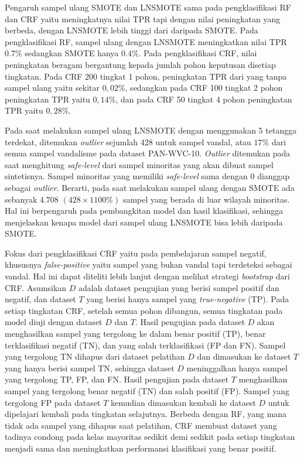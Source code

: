 Pengaruh sampel ulang SMOTE dan LNSMOTE sama pada pengklasifikasi RF dan
CRF yaitu meningkatnya nilai TPR tapi dengan nilai peningkatan yang berbeda,
dengan LNSMOTE lebih tinggi dari daripada SMOTE.
Pada pengklasifikasi RF, sampel ulang dengan LNSMOTE meningkatkan nilai TPR
$0.7\%$ sedangkan SMOTE hanya $0.4\%$.
Pada pengklasifikasi CRF, nilai peningkatan beragam bergantung kepada jumlah
pohon keputusan disetiap tingkatan.
Pada CRF 200 tingkat 1 pohon, peningkatan TPR dari yang tanpa sampel ulang
yaitu sekitar $0,02\%$, sedangkan pada CRF 100 tingkat 2 pohon peningkatan TPR
yaitu $0,14\%$, dan pada CRF 50 tingkat 4 pohon peningkatan TPR yaitu $0,28\%$.


Pada saat melakukan sampel ulang LNSMOTE dengan menggunakan 5 tetangga
terdekat, ditemukan \textit{outlier} sejumlah 428 untuk sampel vandal, atau
$17\%$ dari semua sampel vandalisme pada dataset PAN-WVC-10.
\textit{Outlier} ditemukan pada saat menghitung \textit{safe-level} dari sampel
minoritas yang akan dibuat sampel sintetisnya.
Sampel minoritas yang memiliki \textit{safe-level} sama dengan  $ 0 $
dianggap sebagai \textit{outlier}.
Berarti, pada saat melakukan sampel ulang dengan SMOTE ada sebanyak
$ 4.708 $ $ (428 \times 1100\%) $
sampel yang berada di luar wilayah minoritas.
Hal ini berpengaruh pada pembangkitan model dan hasil klasifikasi, sehingga
menjelaskan kenapa model dari sampel ulang LNSMOTE bisa lebih daripada SMOTE.


Fokus dari pengklasifikasi CRF yaitu pada pembelajaran sampel negatif,
khususnya \textit{false-positive} yaitu sampel yang bukan vandal tapi
terdeteksi sebagai vandal.
Hal ini dapat diteliti lebih lanjut dengan melihat strategi \textit{bootstrap}
dari CRF.
Asumsikan $D$ adalah dataset pengujian yang berisi sampel positif dan negatif,
dan dataset $T$ yang berisi hanya sampel yang \textit{true-negative} (TP).
Pada setiap tingkatan CRF, setelah semua pohon dibangun, semua tingkatan pada
model diuji dengan dataset $D$ dan $T$.
Hasil pengujian pada dataset $D$ akan menghasilkan sampel yang tergolong ke
dalam benar positif (TP), benar terklasifikasi negatif (TN), dan yang salah
terklasifikasi (FP dan FN).
Sampel yang tergolong TN dihapus dari dataset pelatihan $D$ dan dimasukan ke
dataset $T$ yang hanya berisi sampel TN, sehingga dataset $D$ meninggalkan
hanya sampel yang tergolong TP, FP, dan FN.
Hasil pengujian pada dataset $T$ menghasilkan sampel yang tergolong benar
negatif (TN) dan salah positif (FP).
Sampel yang tergolong FP pada dataset $T$ kemudian dimasukan kembali ke dataest
$D$ untuk dipelajari kembali pada tingkatan selajutnya.
Berbeda dengan RF, yang mana tidak ada sampel yang dihapus saat
pelatihan, CRF membuat dataset yang tadinya condong pada kelas mayoritas
sedikit demi sedikit pada setiap tingkatan menjadi sama dan meningkatkan
performansi klasifikasi yang benar positif.
